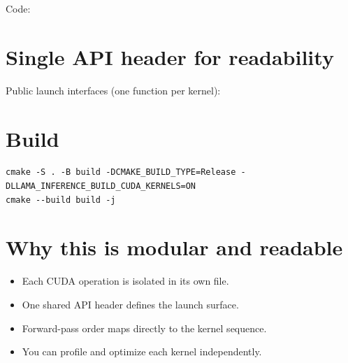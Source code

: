 \documentclass[11pt]{article}
\begin{document}
Code:


\section{Single API header for readability}
Public launch interfaces (one function per kernel):


\section{Build}
\begin{lstlisting}[style=code]
cmake -S . -B build -DCMAKE_BUILD_TYPE=Release -DLLAMA_INFERENCE_BUILD_CUDA_KERNELS=ON
cmake --build build -j
\end{lstlisting}

\section{Why this is modular and readable}
\begin{itemize}[leftmargin=*]
  \item Each CUDA operation is isolated in its own file.
  \item One shared API header defines the launch surface.
  \item Forward-pass order maps directly to the kernel sequence.
  \item You can profile and optimize each kernel independently.
\end{itemize}
\end{document}
